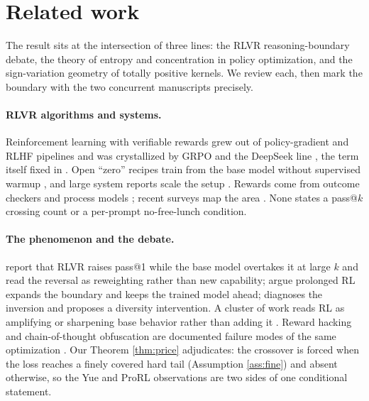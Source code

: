 \section{Related work}
\label{sec:related}

The result sits at the intersection of three lines: the RLVR reasoning-boundary
debate, the theory of entropy and concentration in policy optimization, and the
sign-variation geometry of totally positive kernels. We review each, then mark
the boundary with the two concurrent manuscripts precisely.

\paragraph{RLVR algorithms and systems.}
Reinforcement learning with verifiable rewards grew out of policy-gradient and
RLHF pipelines \citep{schulman2017ppo,ouyang2022instructgpt,ahmadian2024rloo,hu2025reinforceplusplus,kazemnejad2024vineppo}
and was crystallized by GRPO and the DeepSeek line
\citep{shao2024deepseekmath,deepseekai2025r1,yu2025dapo,liu2025drgrpo}, the term
itself fixed in \citep{lambert2024tulu3}. Open ``zero'' recipes train from the
base model without supervised warmup
\citep{hu2025orz,zeng2025simplerl,zhao2025absolutezero,yan2025luffy,luong2024reft},
and large system reports scale the setup
\citep{kimiteam2025k15,he2025skywork,mistral2025magistral,bercovich2025llamanemotron,yang2024qwen25math,wei2025swerl,khatri2025scalerl}.
Rewards come from outcome checkers and process models
\citep{cobbe2021gsm8k,uesato2022process,lightman2023verify,wang2024mathshepherd,zhang2025prmlessons,ma2025generalreasoner};
recent surveys map the area \citep{xu2025surveyLRM,zhang2025surveyRL}. None states
a pass@$k$ crossing count or a per-prompt no-free-lunch condition.

\paragraph{The phenomenon and the debate.}
\citet{yue2025rlincentivize} report that RLVR raises pass@1 while the base model
overtakes it at large $k$ and read the reversal as reweighting rather than new
capability; \citet{liu2025prorl} argue prolonged RL expands the boundary and
keeps the trained model ahead; \citet{zhou2026shrink} diagnoses the inversion and
proposes a diversity intervention. A cluster of work reads RL as amplifying or
sharpening base behavior rather than adding it
\citep{zhao2025echochamber,setlur2024incorrect,huang2024sharpening,shao2025spurious,wu2025invisibleleash}.
Reward hacking and chain-of-thought obfuscation are documented failure modes of the same optimization \citep{baker2025monitoring}. Our Theorem \ref{thm:price} adjudicates: the crossover is forced when the loss
reaches a finely covered hard tail (Assumption \ref{ass:fine}) and absent
otherwise, so the Yue and ProRL observations are two sides of one conditional
statement.

